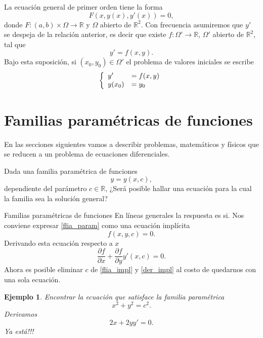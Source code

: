 \documentclass{article}
\newcommand{\rr}{\mathbb{R}}
\newtheorem{ejemplo}{Ejemplo}}
\begin{document}
\begin{definicion} La ecuación general de primer orden tiene la forma
\[
F(x,y(x),y'(x))=0,
\]
donde $F:(a,b)\times \Omega\to\rr$ y $\Omega$ abierto de $\rr^2$. Con frecuencia asumiremos que $y'$ se despeja de la relación anterior, es decir que existe $f:\Omega'\to\rr$,
$\Omega'$ abierto de $\rr^2$, tal que
\[y'=f(x,y).\]
Bajo esta suposición, si $(x_0,y_0)\in\Omega'$ el problema de valores iniciales se escribe
\[\left\{\begin{array}{l l}
	    y'&=f(x,y)\\
	    y(x_0)&=y_0
         \end{array}\right.
\]
\end{definicion}



\section{Familias paramétricas de funciones}

En las secciones siguientes vamos a describir problemas, matemáticos y físicos que se reducen a un problema de ecuaciones diferenciales.


\begin{problema}
Dada una familia paramétrica de funciones
 \begin{equation}\label{flia_param}y=y(x,c),\end{equation}
 dependiente del parámetro $c\in\rr$, ¿Será posible hallar una ecuación para la cual la familia sea la solución general?
\end{problema}


{Familias paramétricas de funciones}
En líneas generales la respuesta es si. Nos conviene expresar \eqref{flia_param} como una ecuación implícita
\begin{equation}\label{flia_impl}f(x,y,c)=0.\end{equation}
Derivando esta ecuación respecto a $x$
\begin{equation}\label{der_impl}
 \frac{\partial f}{\partial x}+\frac{\partial f}{\partial y}y'(x,c)=0.
\end{equation}
Ahora es posible eliminar $c$ de \eqref{flia_impl} y \eqref{der_impl} al costo de quedarnos con una sola ecuación.




\begin{ejemplo} Encontrar la ecuación que satisface la familia paramétrica
\[x^2+y^2=c^2.\]
Derivamos
\[2x+2yy'=0.\]
Ya está!!!
\end{ejemplo}
\end{document}

